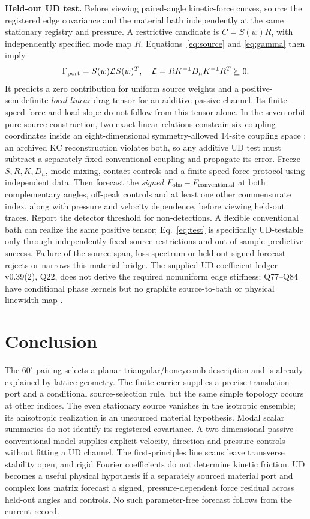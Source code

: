 \documentclass[9pt,a4paper,twocolumn]{extarticle}
\begin{document}
\textbf{Held-out UD test.} Before viewing paired-angle kinetic-force curves, source the registered edge covariance and the material bath independently at the same stationary registry and pressure. A restrictive candidate is $C=S(w)R$, with independently specified mode map $R$. Equations~\eqref{eq:source} and \eqref{eq:gamma} then imply
\begin{equation}
 \Gamma_{\rm port}=S(w)\mathcal L S(w)^T,\quad
 \mathcal L=RK^{-1}D_hK^{-1}R^T\succeq0.\label{eq:test}
\end{equation}
It predicts a zero contribution for uniform source weights and a positive-semidefinite \emph{local linear} drag tensor for an additive passive channel. Its finite-speed force and load slope do not follow from this tensor alone. In the seven-orbit pure-source construction, two exact linear relations constrain six coupling coordinates inside an eight-dimensional symmetry-allowed 14-site coupling space \cite{udphysics}; an archived KC reconstruction violates both, so any additive UD test must subtract a separately fixed conventional coupling and propagate its error. Freeze $S,R,K,D_h$, mode mixing, contact controls and a finite-speed force protocol using independent data. Then forecast the \emph{signed} $F_{\rm obs}-F_{\rm conventional}$ at both complementary angles, off-peak controls and at least one other commensurate index, along with pressure and velocity dependence, before viewing held-out traces. Report the detector threshold for non-detections. A flexible conventional bath can realize the same positive tensor; Eq.~\eqref{eq:test} is specifically UD-testable only through independently fixed source restrictions and out-of-sample predictive success. Failure of the source span, loss spectrum or held-out signed forecast rejects or narrows this material bridge. The supplied UD coefficient ledger v0.39(2), Q22, does not derive the required nonuniform edge stiffness; Q77--Q84 have conditional phase kernels but no graphite source-to-bath or physical linewidth map \cite{udledger}.

\section{Conclusion}
The $60^\circ$ pairing selects a planar triangular/honeycomb description and is already explained by lattice geometry. The finite carrier supplies a precise translation port and a conditional source-selection rule, but the same simple topology occurs at other indices. The even stationary source vanishes in the isotropic ensemble; its anisotropic realization is an unsourced material hypothesis. Modal scalar summaries do not identify its registered covariance. A two-dimensional passive conventional model supplies explicit velocity, direction and pressure controls without fitting a UD channel. The first-principles line scans leave transverse stability open, and rigid Fourier coefficients do not determine kinetic friction. UD becomes a useful physical hypothesis if a separately sourced material port and complex loss matrix forecast a signed, pressure-dependent force residual across held-out angles and controls. No such parameter-free forecast follows from the current record.
\end{document}
